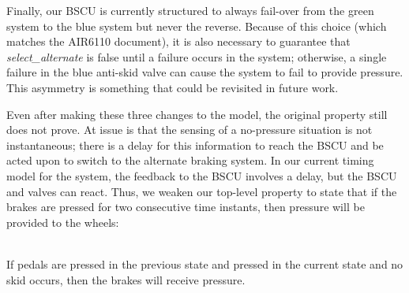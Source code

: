 Finally, our BSCU is currently structured to always fail-over from the green system to the blue system but never the reverse.  Because of this choice (which matches the AIR6110 document), it is also necessary to guarantee that \textit{select\_alternate} is false until a failure occurs in the system; otherwise, a single failure in the blue anti-skid valve can cause the system to fail to provide pressure.  This asymmetry is something that could be revisited in future work.


Even after making these three changes to the model, the original property still does not prove.  At issue is that the sensing of a no-pressure situation is not instantaneous; there is a delay for this information to reach the BSCU and be acted upon to switch to the alternate braking system.  In our current timing model for the system, the feedback to the BSCU involves a delay, but the BSCU and valves can react.  Thus, we weaken our top-level property to state that if the brakes are pressed for two consecutive time instants, then pressure will be provided to the wheels:

\begin{tt}
\ \\
If pedals are pressed in the previous state and pressed in the current state and no skid occurs, then the brakes will receive pressure. \\
\end{tt}



















